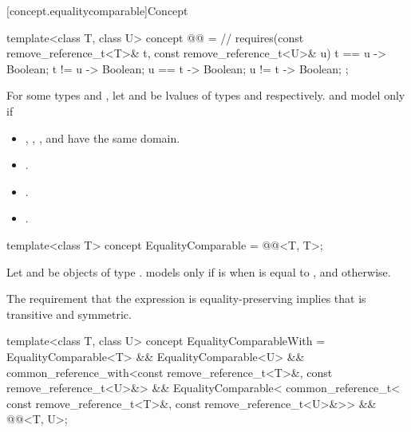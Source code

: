 [concept.equalitycomparable]{Concept }

\begin{itemdecl}
template<class T, class U>
  concept @@ = // \expos
    requires(const remove_reference_t<T>& t,
             const remove_reference_t<U>& u) {
      { t == u } -> Boolean;
      { t != u } -> Boolean;
      { u == t } -> Boolean;
      { u != t } -> Boolean;
    };
\end{itemdecl}

\begin{itemdescr}
\pnum
For some types  and ,
let  and  be lvalues of types
 and
 respectively.
 and  model
 only if
\begin{itemize}
\item {}, , , and 
      have the same domain.
\item {}.
\item {}.
\item {}.
\end{itemize}
\end{itemdescr}

%
\begin{itemdecl}
template<class T>
  concept EqualityComparable = @@<T, T>;
\end{itemdecl}

\begin{itemdescr}
\pnum
Let  and  be objects of type .
 models  only if
 is  when  is equal to
, and  otherwise.

\pnum
\begin{note}
The requirement that the expression  is equality-preserving
implies that \tcode{==} is transitive and symmetric.
\end{note}
\end{itemdescr}

%
\begin{itemdecl}
template<class T, class U>
  concept EqualityComparableWith =
    EqualityComparable<T> && EqualityComparable<U> &&
    common_reference_with<const remove_reference_t<T>&, const remove_reference_t<U>&> &&
    EqualityComparable<
      common_reference_t<
        const remove_reference_t<T>&,
        const remove_reference_t<U>&>> &&
    @@<T, U>;
\end{itemdecl}

